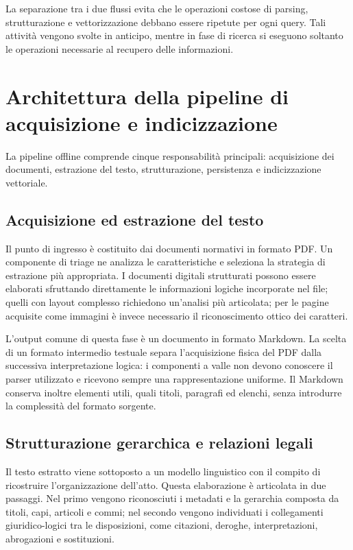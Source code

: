 La separazione tra i due flussi evita che le operazioni costose di parsing, strutturazione e vettorizzazione debbano essere ripetute per ogni query. Tali attività vengono svolte in anticipo, mentre in fase di ricerca si eseguono soltanto le operazioni necessarie al recupero delle informazioni.

\section{Architettura della pipeline di acquisizione e indicizzazione}

La pipeline offline comprende cinque responsabilità principali: acquisizione dei documenti, estrazione del testo, strutturazione, persistenza e indicizzazione vettoriale.

\subsection{Acquisizione ed estrazione del testo}

Il punto di ingresso è costituito dai documenti normativi in formato PDF. Un componente di triage ne analizza le caratteristiche e seleziona la strategia di estrazione più appropriata. I documenti digitali strutturati possono essere elaborati sfruttando direttamente le informazioni logiche incorporate nel file; quelli con layout complesso richiedono un'analisi più articolata; per le pagine acquisite come immagini è invece necessario il riconoscimento ottico dei caratteri.

L'output comune di questa fase è un documento in formato Markdown. La scelta di un formato intermedio testuale separa l'acquisizione fisica del PDF dalla successiva interpretazione logica: i componenti a valle non devono conoscere il parser utilizzato e ricevono sempre una rappresentazione uniforme. Il Markdown conserva inoltre elementi utili, quali titoli, paragrafi ed elenchi, senza introdurre la complessità del formato sorgente.

\subsection{Strutturazione gerarchica e relazioni legali}

Il testo estratto viene sottoposto a un modello linguistico con il compito di ricostruire l'organizzazione dell'atto. Questa elaborazione è articolata in due passaggi. Nel primo vengono riconosciuti i metadati e la gerarchia composta da titoli, capi, articoli e commi; nel secondo vengono individuati i collegamenti giuridico-logici tra le disposizioni, come citazioni, deroghe, interpretazioni, abrogazioni e sostituzioni.

